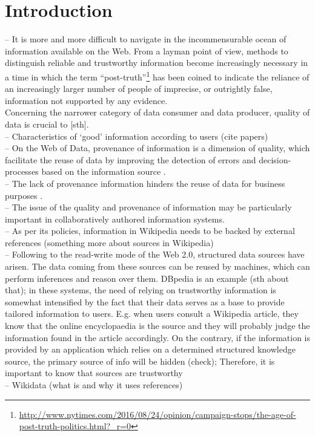 \documentclass{llncs}
\begin{document}
\section{Introduction}
%
-- It is more and more difficult to navigate in the incommensurable ocean of information available on the Web. From a layman point of view, methods to distinguish reliable and trustworthy information become increasingly necessary in a time in which the term ``post-truth''\footnote{\url{http://www.nytimes.com/2016/08/24/opinion/campaign-stops/the-age-of-post-truth-politics.html?\_r=0}} has been coined to indicate the reliance of an increasingly larger number of people of imprecise, or outrightly false, information not supported by any evidence.\\
Concerning the narrower category of data consumer and data producer, quality of data is crucial to [sth].\\
-- Characteristics of `good' information according to users (cite papers)\\
-- On the Web of Data, provenance of information is a dimension of quality, which facilitate the reuse of data by improving the detection of errors and decision-processes based on the information source \cite{DBLP:conf/semweb/LehmannGMN12}.\\
-- The lack of provenance information hinders the reuse of data for business purposes \cite{DBLP:conf/semweb/HartigZ08}.\\
-- The issue of the quality and provenance of information may be particularly important in collaboratively authored information systems.\\
-- As per its policies, information in Wikipedia needs to be backed by external references (something more about sources in Wikipedia)\\
-- Following to the read-write mode of the Web 2.0, structured data sources have arisen. The data coming from these sources can be reused by machines, which can perform inferences and reason over them. DBpedia is an example (sth about that); in these systems, the need of relying on trustworthy information is somewhat intensified by the fact that their data serves as a base to provide tailored information to users. E.g. when users consult a Wikipedia article, they know that the online encyclopaedia is the source and they will probably judge the information found in the article accordingly. On the contrary, if the information is provided by an application which relies on a determined structured knowledge source, the primary source of info will be hidden (check); Therefore, it is important to know that sources are trustworthy\\
-- Wikidata (what is and why it uses references)\\
\end{document}
